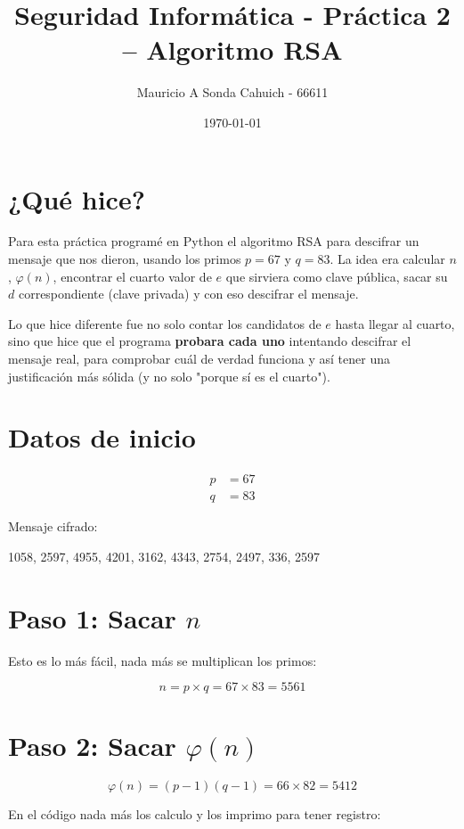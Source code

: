 \documentclass[11pt]{article}
\title{Seguridad Informática - Práctica 2 -- Algoritmo RSA}
\author{Mauricio A Sonda Cahuich - 66611}
\date{\today}
\begin{document}
\maketitle

\section{¿Qué hice?}

Para esta práctica programé en Python el algoritmo RSA para descifrar un
mensaje que nos dieron, usando los primos $p = 67$ y $q = 83$. La idea era
calcular $n$, $\varphi(n)$, encontrar el cuarto valor de $e$ que sirviera
como clave pública, sacar su $d$ correspondiente (clave privada) y con eso
descifrar el mensaje.

Lo que hice diferente fue no solo contar los candidatos de $e$ hasta llegar
al cuarto, sino que hice que el programa \textbf{probara cada uno} intentando
descifrar el mensaje real, para comprobar cuál de verdad funciona y así tener
una justificación más sólida (y no solo "porque sí es el cuarto").

\section{Datos de inicio}

\begin{align*}
p &= 67 \\
q &= 83
\end{align*}

Mensaje cifrado:
\begin{center}
1058, 2597, 4955, 4201, 3162, 4343, 2754, 2497, 336, 2597
\end{center}

\section{Paso 1: Sacar $n$}

Esto es lo más fácil, nada más se multiplican los primos:

\[
n = p \times q = 67 \times 83 = 5561
\]

\section{Paso 2: Sacar $\varphi(n)$}

\[
\varphi(n) = (p-1)(q-1) = 66 \times 82 = 5412
\]

En el código nada más los calculo y los imprimo para tener registro:
\end{document}
